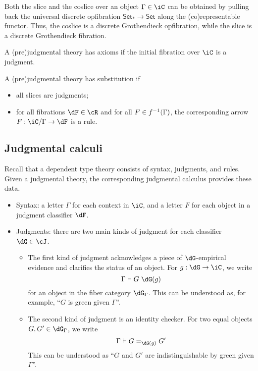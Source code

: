 \documentclass{amsart}
\begin{document}
\begin{rmk}
  Both the slice and the coslice over an object $\Gamma \in \iC$ can be obtained by pulling back the universal discrete opfibration $\textsf{Set}_{*} \to \textsf{Set}$ along the (co)representable functor.
  Thus, the coslice is a discrete Grothendieck opfibration, while the slice is a discrete Grothendieck fibration.
\end{rmk}

\begin{defn}
  A (pre)judgmental theory has axioms if the initial fibration over $\iC$ is a judgment.
\end{defn}

\begin{defn}
  A (pre)judgmental theory has substitution if
  \begin{itemize}
  \item all slices are judgments;
  \item for all fibrations $\dF \in \cR$ and for all $F \in f^{-1}(\Gamma)$, the corresponding arrow $F : \iC/\Gamma \to \dF$ is a rule.
  \end{itemize}
\end{defn}

\subsection{Judgmental calculi}
\label{sec:judgmental-calculi}

Recall that a dependent type theory consists of syntax, judgments, and rules.
Given a judgmental theory, the corresponding judgmental calculus provides these data.
\begin{itemize}
\item Syntax: a letter $\Gamma$ for each context in $\iC$, and a letter $F$ for each object in a judgment classifier $\dF$.
\item Judgments: there are two main kinds of judgment for each classifier $\dG \in \cJ$.
  \begin{itemize}
  \item The first kind of judgment acknowledges a piece of $\dG$-empirical evidence and clarifies the status of an object.
    For $g : \dG \to \iC$, we write
    \[
      \Gamma \vdash G~\dG(g)
    \]
    for an object in the fiber category $\dG_{\Gamma}$.
    This can be understood as, for example, ``$G$ is green given $\Gamma$''.
  \item The second kind of judgment is an identity checker.
    For two equal objects $G, G' \in \dG_{\Gamma}$, we write
    \[
      \Gamma \vdash G =_{\dG(g)} G'
    \]
    This can be understood as ``$G$ and $G'$ are indistinguishable by green given $\Gamma$''.
  \end{itemize}
\end{itemize}
\end{document}
